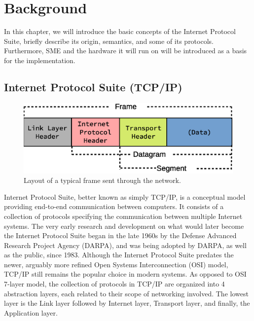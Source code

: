 \chapter{Background}

In this chapter, we will introduce the basic concepts of the Internet Protocol
Suite, briefly describe its origin, semantics, and some of its protocols.
Furthermore, SME and the hardware it will run on will be introduced as a basis
for the implementation.


\section{Internet Protocol Suite (TCP/IP)}
\begin{figure}
\centering
\includegraphics[width=\linewidth]{background/frame.eps}
\caption{Layout of a typical frame sent through the network.}
\label{fig:frame_layout}
\end{figure}


Internet Protocol Suite, better known as simply TCP/IP, is a conceptual
model providing end-to-end communication between computers. It consists of
a collection of protocols specifying the communication between multiple
Internet systems\cite{RFC1122}.  The very early research and development
on what would later become the Internet Protocol Suite began in the late 1960s
by the Defense Advanced Research Project Agency (DARPA), and was being
adopted by DARPA,
as well as the public, since 1983\cite{DARPA_internet}.
Although the Internet Protocol Suite predates the newer, arguably more
refined Open Systems Interconnection (OSI) model, TCP/IP still
remains the popular choice in modern systems.  As opposed to OSI 7-layer
model\cite{X.200}, the collection of protocols in TCP/IP are organized
into 4 abstraction layers, each related to their scope of networking
involved. The lowest layer is the Link layer followed by Internet layer, Transport layer, and
finally, the Application layer.

